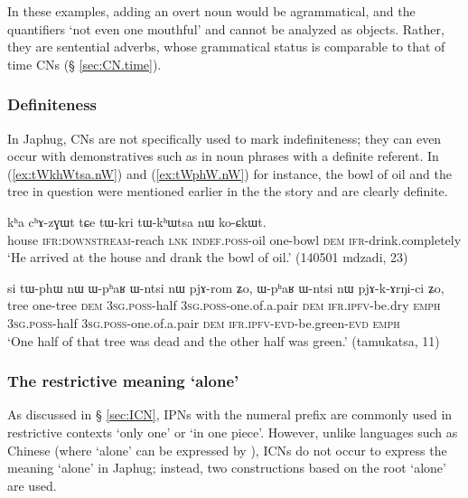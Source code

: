 In these examples, adding an overt noun would be agrammatical, and the quantifiers  `not even one mouthful' and  cannot be analyzed as objects. Rather, they are sentential adverbs, whose grammatical status is comparable to that of time CNs (§ \ref{sec:CN.time}).

\subsubsection{Definiteness} \label{sec:cn/definiteness}
In Japhug, CNs are not specifically used to mark indefiniteness; they can even occur with demonstratives such as  in noun phrases with a definite referent. In  (\ref{ex:tWkhWtsa.nW}) and (\ref{ex:tWphW.nW}) for instance, the bowl of oil and the tree in question were mentioned earlier in the  the story and are clearly definite.

\begin{exe}
\ex \label{ex:tWkhWtsa.nW}
\gll kʰa cʰɤ-zɣɯt tɕe tɯ-kri tɯ-kʰɯtsa nɯ ko-ɕkɯt.  \\
house \textsc{ifr}:\textsc{downstream}-reach \textsc{lnk} \textsc{indef}.\textsc{poss}-oil one-bowl \textsc{dem} \textsc{ifr}-drink.completely \\
\glt `He arrived at the house and drank the bowl of oil.' (140501 mdzadi, 23)
\end{exe}

\begin{exe}
\ex \label{ex:tWphW.nW}
\gll
si tɯ-phɯ nɯ ɯ-pʰaʁ ɯ-ntsi nɯ pjɤ-rom ʑo, ɯ-pʰaʁ ɯ-ntsi nɯ pjɤ-k-ɤrŋi-ci ʑo, \\
tree one-tree \textsc{dem} \textsc{3sg}.\textsc{poss}-half \textsc{3sg}.\textsc{poss}-one.of.a.pair \textsc{dem} \textsc{ifr}.\textsc{ipfv}-be.dry \textsc{emph} \textsc{3sg}.\textsc{poss}-half \textsc{3sg}.\textsc{poss}-one.of.a.pair \textsc{dem} \textsc{ifr}.\textsc{ipfv}-\textsc{evd}-be.green-\textsc{evd} \textsc{emph} \\
\glt `One half of that tree was dead and the other half was green.' (tamukatsa, 11)
\end{exe}

\subsubsection{The restrictive meaning `alone'} \label{sec:stWsti}
As discussed in § \ref{sec:ICN},  IPNs with the numeral prefix  are commonly used in restrictive contexts `only one' or  `in one piece'. However, unlike languages such as Chinese (where  `alone' can be expressed by ), ICNs do not occur to express the meaning `alone' in Japhug; instead, two constructions based on the root  `alone' are used.

